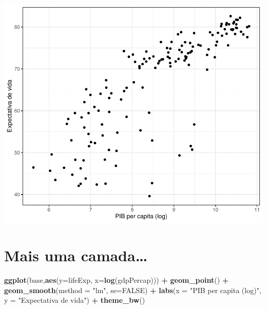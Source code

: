 \documentclass[
]{article}
\newenvironment{Shaded}{\begin{snugshade}}{\end{snugshade}}
\newcommand{\DataTypeTok}[1]{\textcolor[rgb]{0.13,0.29,0.53}{#1}}
\newcommand{\KeywordTok}[1]{\textcolor[rgb]{0.13,0.29,0.53}{\textbf{#1}}}
\newcommand{\NormalTok}[1]{#1}
\newcommand{\OperatorTok}[1]{\textcolor[rgb]{0.81,0.36,0.00}{\textbf{#1}}}
\newcommand{\OtherTok}[1]{\textcolor[rgb]{0.56,0.35,0.01}{#1}}
\newcommand{\StringTok}[1]{\textcolor[rgb]{0.31,0.60,0.02}{#1}}
\begin{document}
\begin{center}\includegraphics{arquivo_pdf_files/figure-latex/scatter-1} \end{center}

\hypertarget{mais-uma-camada}{%
\section{Mais uma camada\ldots{}}\label{mais-uma-camada}}

\begin{Shaded}
\begin{Highlighting}[]
\KeywordTok{ggplot}\NormalTok{(base,}\KeywordTok{aes}\NormalTok{(}\DataTypeTok{y=}\NormalTok{lifeExp, }\DataTypeTok{x=}\KeywordTok{log}\NormalTok{(gdpPercap))) }\OperatorTok{+}\StringTok{ }\KeywordTok{geom_point}\NormalTok{() }\OperatorTok{+}
\StringTok{  }\KeywordTok{geom_smooth}\NormalTok{(}\DataTypeTok{method =} \StringTok{"lm"}\NormalTok{, }\DataTypeTok{se=}\OtherTok{FALSE}\NormalTok{) }\OperatorTok{+}\StringTok{ }
\StringTok{  }\KeywordTok{labs}\NormalTok{(}\DataTypeTok{x =} \StringTok{"PIB per capita (log)"}\NormalTok{,}
       \DataTypeTok{y =} \StringTok{"Expectativa de vida"}\NormalTok{) }\OperatorTok{+}\StringTok{ }\KeywordTok{theme_bw}\NormalTok{()}
\end{Highlighting}
\end{Shaded}
\end{document}
